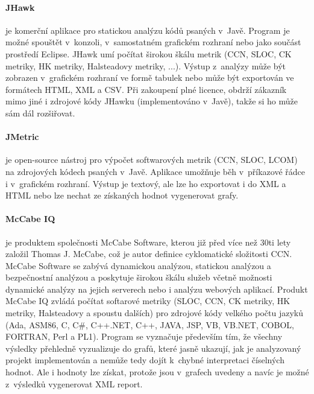 \documentclass[11pt,twoside,a4paper]{book}
\begin{document}
\paragraph{JHawk}\cite{JHawk} je komerční aplikace pro statickou analýzu kódů psaných v~Javě. Program je možné spouštět
v~konzoli, v~samostatném grafickém rozhraní nebo jako součást prostředí Eclipse. JHawk umí počítat širokou
škálu metrik (CCN, SLOC, CK metriky, HK metriky, Halsteadovy metriky, ...). Výstup
z~analýzy může být zobrazen v~grafickém rozhraní ve formě tabulek nebo může být exportován ve formátech
HTML, XML a CSV. Při zakoupení plné licence, obdrží zákazník mimo jiné i zdrojové kódy JHawku (implementováno v~Javě),
takže si ho může sám dál rozšiřovat.

\paragraph{JMetric}\cite{JMetric} je open-source nástroj pro výpočet softwarových metrik (CCN, SLOC, LCOM) na zdrojových kódech psaných v~Javě.
Aplikace umožňuje běh v~příkazové řádce i v~grafickém rozhraní. Výstup je textový, ale lze ho exportovat i do XML a HTML nebo
lze nechat ze získaných hodnot vygenerovat grafy.

\paragraph{McCabe IQ}\cite{McCabeIQ} je produktem společnosti McCabe Software, kterou již před více než 30ti lety založil Thomas J. McCabe,
což je autor definice cyklomatické složitosti CCN. \mbox{McCabe} Software se zabývá dynamickou analýzou, statickou analýzou a bezpečnostní
analýzou a \mbox{poskytuje} širokou škálu služeb včetně možnosti dynamické analýzy na jejich serverech nebo i analýzu webových aplikací.
Produkt McCabe IQ zvládá počítat softarové metriky (SLOC, CCN, CK metriky, HK metriky, Halsteadovy a spoustu dalších) pro zdrojové kódy
velkého počtu jazyků (Ada, ASM86, C, C\#, C++.NET, C++, JAVA, JSP, VB, VB.NET, COBOL, FORTRAN, Perl a PL1). Program se vyznačuje především
tím, že všechny výsledky přehledně vyzualizuje do grafů, které jasně ukazují, jak je analyzovaný projekt implementován a nemůže
tedy dojít k~chybné interpretaci číselných hodnot. Ale i hodnoty lze získat, protože jsou v~grafech uvedeny a navíc je možné z~výsledků
vygenerovat XML report.
\end{document}
